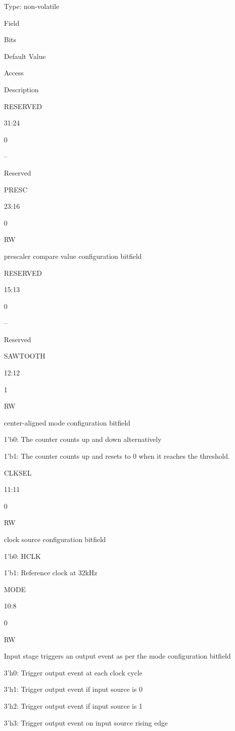     Type: non-volatile

Field
	

Bits
	

Default Value
	

Access
	

Description

RESERVED
	

31:24
	

0
	

–
	

Reserved

PRESC
	

23:16
	

0
	

RW
	

prescaler compare value configuration bitfield

RESERVED
	

15:13
	

0
	

–
	

Reserved

SAWTOOTH
	

12:12
	

1
	

RW
	

center-aligned mode configuration bitfield

1’b0: The counter counts up and down alternatively

1’b1: The counter counts up and resets to 0 when it reaches the threshold.

CLKSEL
	

11:11
	

0
	

RW
	

clock source configuration bitfield

1’b0: HCLK

1’b1: Reference clock at 32kHz

MODE
	

10:8
	

0
	

RW
	

Input stage triggers an output event as per the mode configuration bitfield

3’h0: Trigger output event at each clock cycle

3’h1: Trigger output event if input source is 0

3’h2: Trigger output event if input source is 1

3’h3: Trigger output event on input source rising edge

